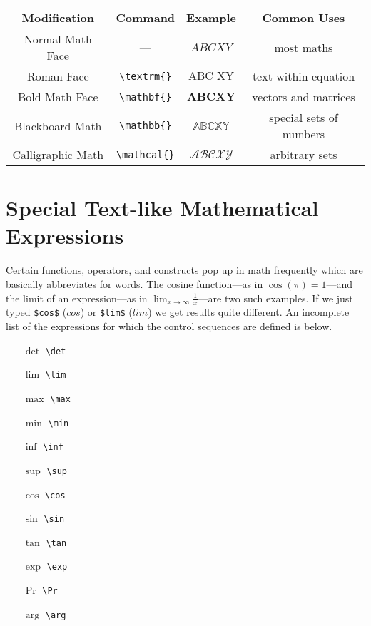 \begin{tabular}{c c c c}
  \hline \hline
  Modification & Command & Example & Common Uses\\
  \hline
  Normal Math Face & ---& $ABC XY$ & most maths\\
  Roman Face & \texttt{\textbackslash textrm\{\}} &  $\textrm{ABC XY}$& text within equation\\
  Bold Math Face & \texttt{\textbackslash mathbf\{\}} &  $\mathbf{ABC XY}$ & vectors and matrices\\
  Blackboard Math & \texttt{\textbackslash mathbb\{\}} &  $\mathbb{ABC XY}$ & special sets of numbers\\
  Calligraphic Math & \texttt{\textbackslash mathcal\{\}} & $\mathcal{ABC XY}$& arbitrary sets\\
  \hline \hline
\end{tabular}

\section{Special Text-like Mathematical Expressions}

Certain functions, operators, and constructs pop up in math frequently
which are basically abbreviates for words. The cosine function---as in
$\cos(\pi)=1$---and the limit of an expression---as in $\lim_{x
  \rightarrow \infty} \frac{1}{x}$---are two such examples. If we just
typed \texttt{\$cos\$} ($cos$) or \texttt{\$lim\$} ($lim$) we get
results quite different. An incomplete list of the expressions for
which the control sequences are defined is below.

\begin{multicols}{4}
\begin{itemize}
\item[$\det$] \texttt{\textbackslash det}
\item[$\lim$] \texttt{\textbackslash lim}
\item[$\max$] \texttt{\textbackslash max}
\item[$\min$] \texttt{\textbackslash min}
\item[$\inf$] \texttt{\textbackslash inf}
\item[$\sup$] \texttt{\textbackslash sup}
\item[$\cos$] \texttt{\textbackslash cos}
\item[$\sin$] \texttt{\textbackslash sin}
\item[$\tan$] \texttt{\textbackslash tan}
\item[$\exp$] \texttt{\textbackslash exp}
\item[$\Pr$] \texttt{\textbackslash Pr}
\item[$\arg$] \texttt{\textbackslash arg}
\end{itemize}
\end{multicols}

